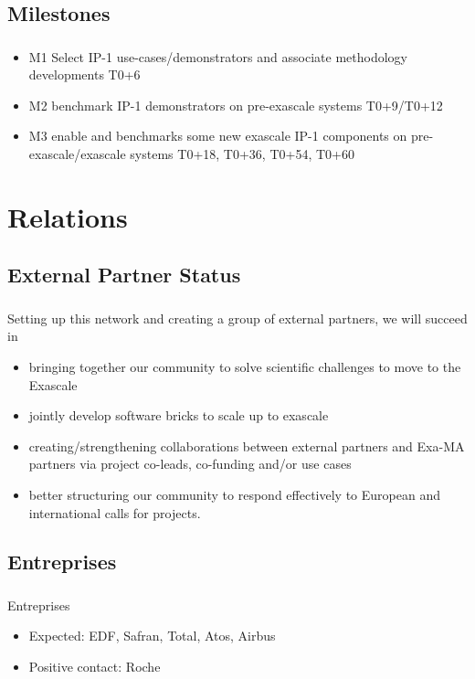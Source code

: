 \subsection{Milestones}

\begin{frame}
  \frametitle{\insertsectionhead}
  \framesubtitle{\insertsubsectionhead}

  \begin{itemize}
    \item   M1 Select IP-1 use-cases/demonstrators and associate methodology developments T0+6
    \item M2 benchmark IP-1 demonstrators on pre-exascale systems T0+9/T0+12
    \item M3 enable and benchmarks some new exascale  IP-1 components on pre-exascale/exascale systems T0+18, T0+36, T0+54, T0+60
\end{itemize}


\end{frame}




\section{Relations}

\subsection*{External Partner Status}
\begin{frame}
  \frametitle{\insertsectionhead}
  \framesubtitle{\insertsubsectionhead}

  Setting up this network and creating a group of external partners, we will succeed in
  \begin{itemize}
    \item bringing together our community to solve scientific challenges to move to the Exascale
    \item jointly develop software bricks to scale up to exascale
    \item creating/strengthening collaborations between external partners and Exa-MA partners via project co-leads, co-funding and/or use cases
    \item better structuring our community to respond effectively to European and international calls for projects.
  \end{itemize}

\end{frame}
\subsection{Entreprises}
\begin{frame}
  \frametitle{\insertsectionhead}
  \framesubtitle{\insertsubsectionhead}
  \begin{alertblock}{Entreprises}
    \begin{itemize}
      \item Expected: EDF, Safran, Total, Atos, Airbus
      \item Positive contact: Roche
    \end{itemize}
  \end{alertblock}
\end{frame}

